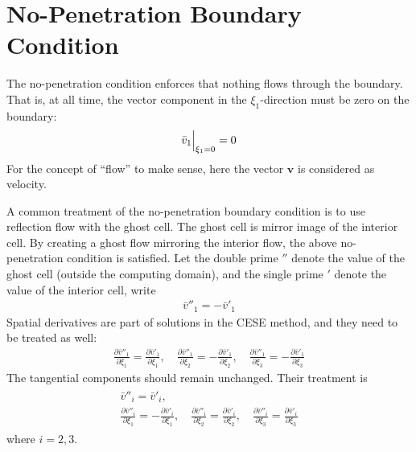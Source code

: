 \documentclass[a4paper,12pt,dvips]{article}
\begin{document}
\section{No-Penetration Boundary Condition}

The no-penetration condition enforces that nothing flows through the boundary.
That is, at all time, the vector component in the $\xi_1$-direction must be
zero on the boundary:
\begin{align*}
  \Bigl.\bar{v}_1\Bigr|_{\xi_1=0} = 0
\end{align*}
For the concept of ``flow'' to make sense, here the vector $\mathbf{v}$ is
considered as velocity.

A common treatment of the no-penetration boundary condition is to use
reflection flow with the ghost cell.  The ghost cell is mirror image of the
interior cell.  By creating a ghost flow mirroring the interior flow, the above
no-penetration condition is satisfied.  Let the double prime ${}''$ denote the
value of the ghost cell (outside the computing domain), and the single prime
${}'$ denote the value of the interior cell, write
\begin{align*}
  \bar{v}''_1 = -\bar{v}'_1
\end{align*}
Spatial derivatives are part of solutions in the CESE method, and they need to
be treated as well:
\begin{align*}
  \frac{\partial \bar{v}''_1}{\partial\xi_1} =
  \frac{\partial \bar{v}'_1}{\partial\xi_1}, \quad
  \frac{\partial \bar{v}''_1}{\partial\xi_2} =
  -\frac{\partial \bar{v}'_1}{\partial\xi_2}, \quad
  \frac{\partial \bar{v}''_1}{\partial\xi_3} =
  -\frac{\partial \bar{v}'_1}{\partial\xi_3}
\end{align*}
The tangential components should remain unchanged.  Their treatment is
\begin{align*}
\begin{gathered}
  \bar{v}''_i = \bar{v}'_i, \\
  \frac{\partial \bar{v}''_i}{\partial\xi_1} =
  -\frac{\partial \bar{v}'_i}{\partial\xi_1}, \quad
  \frac{\partial \bar{v}''_i}{\partial\xi_2} =
  \frac{\partial \bar{v}'_i}{\partial\xi_2}, \quad
  \frac{\partial \bar{v}''_i}{\partial\xi_3} =
  \frac{\partial \bar{v}'_i}{\partial\xi_3}
\end{gathered}
\end{align*}
where $i = 2, 3$.
\end{document}
